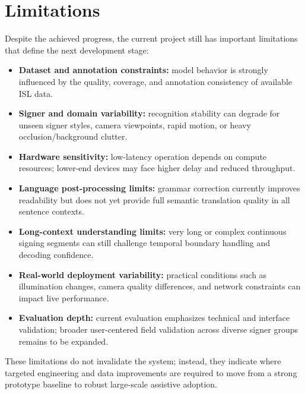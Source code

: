 \section{Limitations}
Despite the achieved progress, the current project still has important limitations that define the next development stage:

\begin{itemize}[leftmargin=1.5em]
\item \textbf{Dataset and annotation constraints:} model behavior is strongly influenced by the quality, coverage, and annotation consistency of available ISL data.
\item \textbf{Signer and domain variability:} recognition stability can degrade for unseen signer styles, camera viewpoints, rapid motion, or heavy occlusion/background clutter.
\item \textbf{Hardware sensitivity:} low-latency operation depends on compute resources; lower-end devices may face higher delay and reduced throughput.
\item \textbf{Language post-processing limits:} grammar correction currently improves readability but does not yet provide full semantic translation quality in all sentence contexts.
\item \textbf{Long-context understanding limits:} very long or complex continuous signing segments can still challenge temporal boundary handling and decoding confidence.
\item \textbf{Real-world deployment variability:} practical conditions such as illumination changes, camera quality differences, and network constraints can impact live performance.
\item \textbf{Evaluation depth:} current evaluation emphasizes technical and interface validation; broader user-centered field validation across diverse signer groups remains to be expanded.
\end{itemize}

These limitations do not invalidate the system; instead, they indicate where targeted engineering and data improvements are required to move from a strong prototype baseline to robust large-scale assistive adoption.
